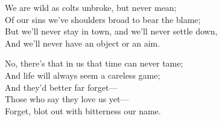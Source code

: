 \begin{poemblock}
We are wild as colts unbroke, but never mean;\\
\idt Of our sins we've shoulders broad to bear the blame;\\
But we'll never stay in town, and we'll never settle down,\\
\idt And we'll never have an object or an aim.

No, there's that in us that time can never tame;\\
And life will always seem a careless game;\\
\idt And they'd better far forget—\\
\idt Those who say they love us yet—\\
Forget, blot out with bitterness our name.

\end{poemblock}
